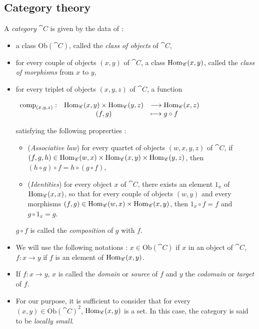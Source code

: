 \subsection{Category theory}

\begin{mydef}
A \textit{category} $\cat{C}$ is given by the data of :
\begin{itemize}
\item[1.] a class Ob$(\cat{C})$, called the \textit{class of objects} of $\cat{C}$,
\item[2.] for every couple of objects $(x,y)$ of $\cat{C}$, a class $\text{Hom}_{\mathscr{C}}(x,y)$, called the \textit{class of morphisms} from $x$ to $y$,
\item[3.] for every triplet of objects $(x,y,z)$ of $\cat{C}$, a function 
\begin{center}
	$\displaystyle \begin{array}{rcll} \text{comp}_{(x,y,z)} : & \text{Hom}_{\mathscr{C}}(x,y) \times \text{Hom}_{\mathscr{C}}(y,z) & \longrightarrow \text{Hom}_{\mathscr{C}}(x,z) \\ & (f,g) & \longmapsto g\circ f \end{array}$
\end{center}
satisfying the following proprerties :
\begin{itemize}
\item[a.] (\textit{Associative law}) for every quartet of objects $(w,x,y,z)$ of $\cat{C}$, if $(f,g,h)\in \text{Hom}_{\mathscr{C}}(w,x) \times \text{Hom}_{\mathscr{C}}(x,y) \times \text{Hom}_{\mathscr{C}}(y,z)$, then $(h\circ g)\circ f = h\circ (g\circ f)$,
\item[b.] (\textit{Identities}) for every object $x$ of $\cat{C}$, there exists an element $1_x$ of $\text{Hom}_{\mathscr{C}}(x,x)$, so that for every couple of objects $(w,y)$ and every morphisms $(f,g)\in \text{Hom}_{\mathscr{C}}(w,x)\times \text{Hom}_{\mathscr{C}}(x,y)$, then $1_x\circ f = f$ and $g\circ 1_x = g$.\\

\end{itemize}
$g \circ f$ is called the \textit{composition} of $g$ with $f$.
\end{itemize}

\end{mydef}


\begin{myrem}
\begin{itemize}
\item[1.] We will use the following notations : $x\in \text{Ob}(\cat{C})$ if $x$ in an object of $\cat{C}$, $f: x\to y$ if $f$ is an element of $\text{Hom}_{\mathscr{C}}(x,y)$.
\item[2.] If $f:x\to y$, $x$ is called the \textit{domain} or \textit{source} of $f$ and $y$ the \textit{codomain} or \textit{target} of $f$.
\item[3.] For our purpose, it is sufficient to consider that for every $(x,y)\in \text{Ob}(\cat{C})^2$, $\text{Hom}_{\mathscr{C}}(x,y)$ is a set. In this case, the category is said to be \textit{locally small}.
\end{itemize}
\end{myrem}

